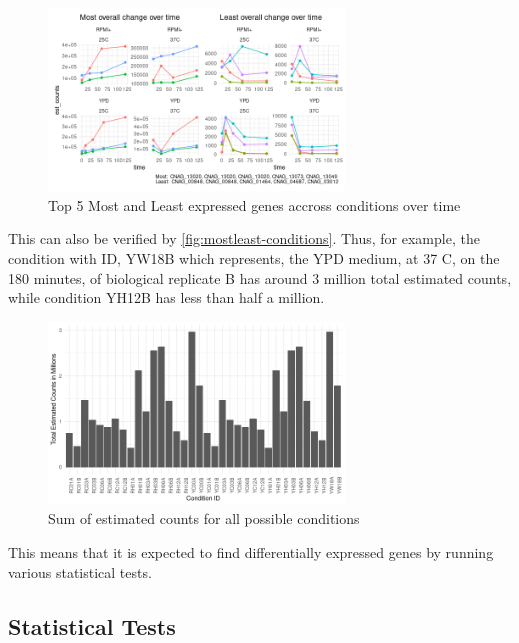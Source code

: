 \documentclass[11pt,twoside]{article}
\numberwithin{Theorem}{section}
\numberwithin{Definition}{section}
\numberwithin{Lemma}{section}
\numberwithin{Algorithm}{section}
\numberwithin{equation}{section}
\begin{document}
\vspace*{1em}
\begin{figure}[!h]
\centering
\includegraphics[width=0.7\textwidth]{./output/most-vs-least.pdf}
\caption{Top 5 Most and Least expressed genes accross conditions over time}
\label{fig:mostleast}
\end{figure}
\vspace{2em}

This can also be verified by \autoref{fig:mostleast-conditions}. Thus, for example, the condition with ID, YW18B which represents, the YPD medium, at 37 C, on the 180 minutes, of biological replicate B has around 3 million total estimated counts, while condition YH12B has less than half a million. 

\vspace*{1em}
\begin{figure}[!h]
\centering
\includegraphics[width=0.7\textwidth]{./output/most-vs-least-conditions.pdf}
\caption{Sum of estimated counts for all possible conditions}
\label{fig:mostleast-conditions}
\end{figure}

This means that it is expected to find differentially expressed genes by running various statistical tests.

\subsection{Statistical Tests}
\label{tests}
\end{document}
